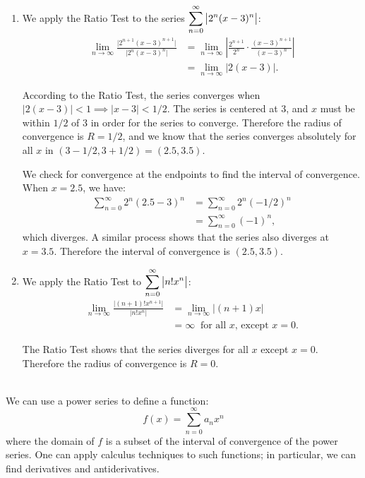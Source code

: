 {\begin{enumerate}
	When $x=1$, we have the series $\ds \sum_{n=1}^\infty (-1)^{n+1}\frac{(1)^n}{n}$, which is the Alternating Harmonic Series, which converges. Therefore the interval of convergence is $(-1,1]$.
	
	\item		We apply the Ratio Test to the series $\displaystyle\sum_{n=0}^\infty \big|2^n(x-3)^n\big|$:
	\begin{align*}
	\lim_{n\to\infty} \frac{\big| 2^{n+1}(x-3)^{n+1}\big|}{\big|2^n(x-3)^n\big|} &= \lim_{n\to\infty} \left|\frac{2^{n+1}}{2^n}\cdot\frac{(x-3)^{n+1}}{(x-3)^n}\right|\\
			&=\lim_{n\to\infty} \big|2(x-3)\big|.
	\end{align*}
	
According to the Ratio Test, the series converges when $\big|2(x-3)\big|<1 \implies \big|x-3\big| < 1/2$. The series is centered at 3, and $x$ must be within $1/2$ of 3 in order for the series to converge. Therefore the radius of convergence is $R=1/2$, and we know that the series converges absolutely for all $x$ in $(3-1/2,3+1/2) = (2.5, 3.5)$.

We check for convergence at the endpoints to find the interval of convergence. When $x=2.5$, we have:
\begin{align*}
\sum_{n=0}^\infty 2^n(2.5-3)^n &= \sum_{n=0}^\infty 2^n(-1/2)^n \\
			&=\sum_{n=0}^\infty (-1)^n,
\end{align*}
which diverges. A similar process shows that the series also diverges at $x=3.5$. Therefore the interval of convergence is $(2.5, 3.5)$.

\item		We apply the Ratio Test to $\displaystyle \sum_{n=0}^\infty \big|n!x^n\big|$:
\begin{align*}
\lim_{n\to\infty} \frac{\big| (n+1)!x^{n+1}\big|}{\big|n!x^n\big|} &= \lim_{n\to\infty} \big|(n+1)x\big|\\
		&= \infty\ \text{ for all $x$, except $x=0$.}
\end{align*}

The Ratio Test shows that the series diverges for all $x$ except $x=0$. Therefore the radius of convergence is $R=0$.
\end{enumerate}
\baselineskip
}\\

We can use a power series to define a function:
$$f(x) = \sum_{n=0}^\infty a_nx^n$$
where the domain of $f$ is a subset of the interval of convergence of the power series. One can apply calculus techniques to such functions; in particular, we can find derivatives and antiderivatives. 

